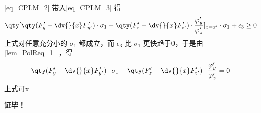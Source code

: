 \autoref{eq_CPLM_2} 带入\autoref{eq_CPLM_3} 得
\begin{equation}
\qty[\qty(F'_y-\dv{}{x}F'_{y'})\cdot\sigma_1-\qty(F'_z-\dv{}{x}F'_{z'})\cdot\frac{\varphi'_y}{\varphi'_z}]_{x=x'}\cdot\sigma_1+\epsilon_3\geq0
\end{equation}
上式对任意充分小的 $\sigma_1$ 都成立，而 $\epsilon_3$ 比 $\sigma_1$ 更快趋于0，于是由\autoref{lem_PolReq_1}~，得
\begin{equation}
\qty(F'_y-\dv{}{x}F'_{y'})\cdot\sigma_1-\qty(F'_z-\dv{}{x}F'_{z'})\cdot\frac{\varphi'_y}{\varphi'_z}=0
\end{equation}
上式可x

\textbf{证毕！}